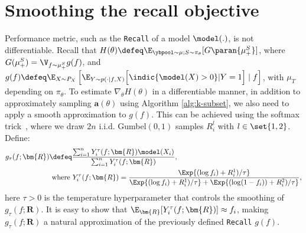 \section{Smoothing the recall objective} \label{sec:details-recall-smoothing}
 
Performance metric, such as the \texttt{Recall} of a model $\model(.)$,  is not differentiable. Recall that $  H(\theta) \defeq \E_{{\ybpool \sim \mu; S \sim \pi_\theta } }  [G\paran{\mu_+^S}]$,  where $G(\mu_+^S) = \V_{f \sim \mu_+^S}  g(f)$, and $g(f) \defeq  \E_{X \sim P_X}\left[ \E_{Y \sim p(\cdot|f,X) } \Big[\indic{\model(X)>0}|Y=1\Big]\mid f \right]$,  with $\mu_T$ depending on $\pi_\theta$. To estimate $\nabla_\theta H(\theta)$  in a differentiable manner, in addition to approximately sampling 
$\bm{a}(\theta)$ using Algorithm \ref{alg:k-subset},  we also need to apply a smooth approximation to $g(f)$. This can be  achieved using the softmax trick~\citep{JangGuPo17}, where we draw $2n$ i.i.d. Gumbel$(0,1)$ samples $R_{i}^{l}$ with $l \in \set{1,2}$. 
Define:
\begin{align*}
g_{\tau}(f; \bm{R}) & \defeq \frac{\sum_{i=1}^n  Y^{\tau}_i(f; \bm{R})  \model(X_i)}{\sum_{i=1}^n Y^{\tau}_i(f; \bm{R})}, \\
&\text{ where }
Y^{\tau}_i(f;\bm{R}) = \frac{\Exp{(\log f_i) + R_i^1) / \tau}}{
\Exp{(\log f_i) + R_i^1) / \tau}
+ \Exp{(\log (1-f_i)) + R_i^2) / \tau}
},
\end{align*} here  $\tau > 0$ is the temperature hyperparameter that controls the smoothing of $g_{\tau}(f; \bm{R})$. 
It is easy to show that $\E_{\bm{R}}[Y^{\tau}_i(f;\bm{R})] \approx f_i$,  making $g_{\tau}(f; \bm{R})$  a natural approximation of the previously defined \texttt{Recall} $g(f)$.






